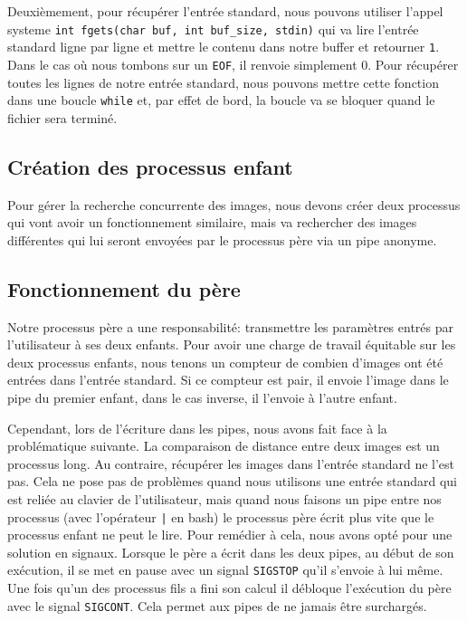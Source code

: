 \documentclass[french]{article}
\begin{document}
Deuxièmement, pour récupérer l'entrée standard, nous pouvons utiliser l'appel systeme \texttt{int fgets(char buf, int buf\_size, stdin)} qui va lire
l'entrée standard ligne par ligne et mettre le contenu dans notre buffer et retourner \texttt{1}. Dans le cas où nous tombons sur un \texttt{EOF}, il renvoie 
simplement 0. Pour récupérer toutes les lignes de notre entrée standard, nous pouvons mettre cette fonction dans une boucle \texttt{while} et, par effet de bord,
la boucle va se bloquer quand le fichier sera terminé. 

\subsection{Création des processus enfant}
Pour gérer la recherche concurrente des images, nous devons créer deux processus qui vont avoir un fonctionnement similaire, mais va rechercher des images différentes
qui lui seront envoyées par le processus père via un pipe anonyme.

\subsection{Fonctionnement du père}
Notre processus père a une responsabilité: transmettre les paramètres entrés par l'utilisateur à ses deux enfants. Pour avoir une charge de travail équitable sur les 
deux processus enfants, nous tenons un compteur de combien d'images ont été entrées dans l'entrée standard. Si ce compteur est pair, il envoie l'image dans le pipe 
du premier enfant, dans le cas inverse, il l'envoie à l'autre enfant. 

Cependant, lors de l'écriture dans les pipes, nous avons fait face à la problématique suivante. La comparaison de distance entre deux images est un processus long. Au 
contraire, récupérer les images dans l'entrée standard ne l'est pas. Cela ne pose pas de problèmes quand nous utilisons une entrée standard qui est reliée au clavier 
de l'utilisateur, mais quand nous faisons un pipe entre nos processus (avec l'opérateur \texttt{|} en bash) le processus père écrit plus vite 
que le processus enfant ne peut le lire. Pour remédier à cela, nous avons opté pour une solution en signaux. Lorsque le père a écrit dans les deux pipes, au début 
de son exécution, il se met en pause avec un signal \texttt{SIGSTOP} qu'il s'envoie à lui même. Une fois qu'un des processus fils a fini son calcul il débloque 
l'exécution du père avec le signal \texttt{SIGCONT}. Cela permet aux pipes de ne jamais être surchargés. 
\end{document}
